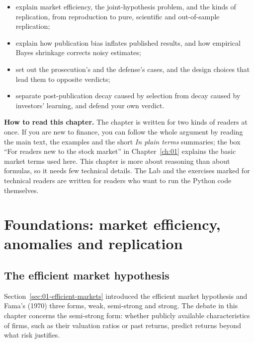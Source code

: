 \begin{itemize}
  \item explain market efficiency, the joint-hypothesis problem, and the kinds of replication, from reproduction to pure, scientific and out-of-sample replication;
  \item explain how publication bias inflates published results, and how empirical Bayes shrinkage corrects noisy estimates;
  \item set out the prosecution's and the defense's cases, and the design choices that lead them to opposite verdicts;
  \item separate post-publication decay caused by selection from decay caused by investors' learning, and defend your own verdict.
\end{itemize}

\begin{callout}
\textbf{How to read this chapter.} The chapter is written for two kinds of readers at once. If you are new to finance, you can follow the whole argument by reading the main text, the examples and the short \emph{In plain terms} summaries; the box ``For readers new to the stock market'' in Chapter~\ref{ch:01} explains the basic market terms used here. This chapter is more about reasoning than about formulas, so it needs few technical details. The Lab and the exercises marked for technical readers are written for readers who want to run the Python code themselves.
\end{callout}

\section{Foundations: market efficiency, anomalies and replication}
\label{sec:19-foundations}

\subsection{The efficient market hypothesis}

Section~\ref{sec:01-efficient-markets} introduced the efficient market hypothesis and Fama's (1970) three forms, weak, semi-strong and strong. The debate in this chapter concerns the semi-strong form: whether publicly available characteristics of firms, such as their valuation ratios or past returns, predict returns beyond what risk justifies.

